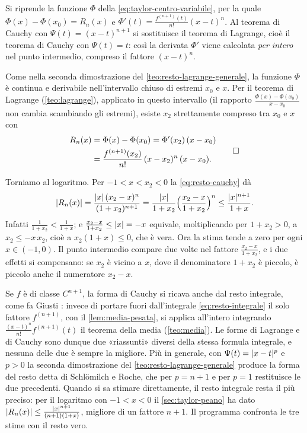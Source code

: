 \begin{strategia}
Si riprende la funzione $\Phi$ della \eqref{eq:taylor-centro-variabile}, per la quale
$\Phi(x)-\Phi(x_{0})=R_{n}(x)$ e $\Phi'(t)=\frac{f^{(n+1)}(t)}{n!}(x-t)^{n}$. Al teorema di Cauchy con
$\Psi(t)=(x-t)^{n+1}$ si sostituisce il teorema di Lagrange, cioè il teorema di Cauchy con
$\Psi(t)=t$: così la derivata $\Phi'$ viene calcolata \emph{per intero} nel punto intermedio,
compreso il fattore $(x-t)^{n}$.
\end{strategia}

\begin{dimostrazione}
Come nella seconda dimostrazione del \cref{teo:resto-lagrange-generale}, la funzione $\Phi$
è continua e derivabile nell'intervallo chiuso di estremi $x_{0}$ e $x$. Per il teorema di
Lagrange (\cref{teo:lagrange}), applicato in questo intervallo (il rapporto
$\frac{\Phi(x)-\Phi(x_{0})}{x-x_{0}}$ non cambia scambiando gli estremi), esiste $x_{2}$ strettamente
compreso tra $x_{0}$ e $x$ con
\[
\begin{aligned}
  R_{n}(x)&=\Phi(x)-\Phi(x_{0})=\Phi'(x_{2})\,(x-x_{0})\\
  &=\frac{f^{(n+1)}(x_{2})}{n!}\,(x-x_{2})^{n}\,(x-x_{0}) .
\end{aligned}
\qedhere
\]
\end{dimostrazione}

Torniamo al logaritmo. Per $-1<x<x_{2}<0$ la \eqref{eq:resto-cauchy} dà
\[
  \lvert R_{n}(x)\rvert=\frac{\lvert x\rvert\,(x_{2}-x)^{n}}{(1+x_{2})^{n+1}}
  =\frac{\lvert x\rvert}{1+x_{2}}\Bigl(\frac{x_{2}-x}{1+x_{2}}\Bigr)^{n}\le\frac{\lvert x\rvert^{n+1}}{1+x} .
\]
Infatti $\frac1{1+x_{2}}<\frac1{1+x}$; e $\frac{x_{2}-x}{1+x_{2}}\le\lvert x\rvert=-x$ equivale, moltiplicando per
$1+x_{2}>0$, a $x_{2}\le-x\,x_{2}$, cioè a $x_{2}(1+x)\le0$, che è vera. Ora la stima tende a zero
per ogni $x\in(-1,0)$. Il punto intermedio compare due volte nel fattore
$\frac{x_{2}-x}{1+x_{2}}$, e i due effetti si compensano: se $x_{2}$ è vicino a $x$, dove il
denominatore $1+x_{2}$ è piccolo, è piccolo anche il numeratore $x_{2}-x$.

\begin{osservazione}\label{oss:tre-forme-resto}
Se $f$ è di classe $C^{n+1}$, la forma di Cauchy si ricava anche dal resto integrale,
come fa Giusti \cite{giusti}: invece di portare fuori dall'integrale
\eqref{eq:resto-integrale} il solo fattore $f^{(n+1)}$, con il \cref{lem:media-pesata}, si
applica all'intero integrando $\frac{(x-t)^{n}}{n!}f^{(n+1)}(t)$ il teorema della media
(\cref{teo:media}). Le forme di Lagrange e di Cauchy sono dunque due «riassunti» diversi
della stessa formula integrale, e nessuna delle due è sempre la migliore. Più in
generale, con $\Psi(t)=\lvert x-t\rvert^{p}$ e $p>0$ la seconda dimostrazione del
\cref{teo:resto-lagrange-generale} produce la forma del resto detta di Schlömilch e
Roche, che per $p=n+1$ e per $p=1$ restituisce le due precedenti. Quando si sa
stimare direttamente, il resto integrale resta il più preciso: per il logaritmo con
$-1<x<0$ il \cref{sec:taylor-peano} ha dato $\lvert R_{n}(x)\rvert\le\frac{\lvert x\rvert^{n+1}}{(n+1)(1+x)}$, migliore
di un fattore $n+1$. Il programma confronta le tre stime con il resto vero.
\end{osservazione}

